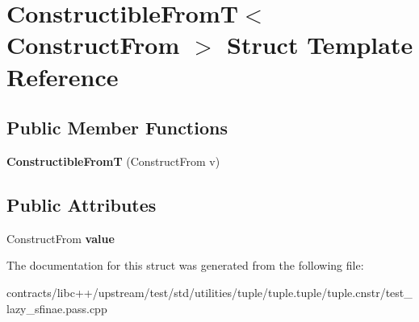 \hypertarget{struct_constructible_from_t}{}\section{Constructible\+FromT$<$ Construct\+From $>$ Struct Template Reference}
\label{struct_constructible_from_t}
\subsection*{Public Member Functions}
\begin{DoxyCompactItemize}
\item 
\mbox{\label{struct_constructible_from_t_a34e99efcef13252118172569a4ce226c}} 
{\bfseries Constructible\+FromT} (Construct\+From v)
\end{DoxyCompactItemize}
\subsection*{Public Attributes}
\begin{DoxyCompactItemize}
\item 
\mbox{\label{struct_constructible_from_t_a0fa0ce5b14f9ef68c58c6c689c62d60f}} 
Construct\+From {\bfseries value}
\end{DoxyCompactItemize}


The documentation for this struct was generated from the following file\+:\begin{DoxyCompactItemize}
\item 
contracts/libc++/upstream/test/std/utilities/tuple/tuple.\+tuple/tuple.\+cnstr/test\+\_\+lazy\+\_\+sfinae.\+pass.\+cpp\end{DoxyCompactItemize}
